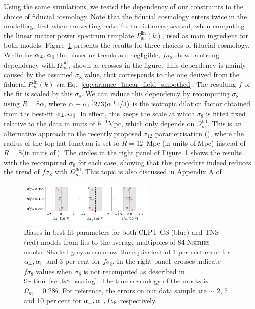 Using the same simulations, we tested the dependency of our constraints to the choice of 
fiducial cosmology. Note that the fiducial cosmology enters twice in the modelling, first
when converting redshifts to distances; second, when computing the linear matter power spectrum 
template $P_m^\text{lin}(k)$, used as main ingredient for both models. 
Figure~\ref{fig:rsd_fid_cosmo} presents the results for three choices of fiducial cosmology. 
While for ${\alpha_\perp}, {\alpha_\parallel}$ the biases or trends are negligible, $f\sigma_8$ shows 
a strong dependency with $\Omega_m^\text{fid}$, shown as crosses in the figure. 
This dependency is mainly caused by the assumed $\sigma_8$ value, that corresponds to the 
one derived from the fiducial $P_m^\text{lin}(k)$ via Eq.~\ref{eq:variance_linear_field_smoothed}.
The resulting $f$ of the fit is scaled by this $\sigma_8$. 
We can reduce this dependency by recomputing $\sigma_8$ using $R=8\alpha$\hmpc,
where $\alpha \equiv {\alpha_\perp}^(2/3){\alpha_\parallel}^(1/3)$ is the isotropic dilation factor obtained from the best-fit ${\alpha_\perp},{\alpha_\parallel}$.
In effect, this keeps the scale at which $\sigma_8$ is fitted fixed relative 
to the data in units of $h^{-1}$Mpc, which only depends on $\Omega_m^\text{fid}$. 
This is an alternative approach to the recently proposed $\sigma_{12}$ parametrisation 
(\cite{sanchezArgumentsUsingMpc2020}), where the radius of the top-hat function is set to 
$R=12$~Mpc (in units of Mpc) instead of $R=8$\hmpc (in units of \hmpc). 
The circles in the right panel of Figure~\ref{fig:rsd_fid_cosmo} shows the results with 
the recomputed $\sigma_8$ for each case, showing that this procedure indeed reduces the 
trend of $f\sigma_8$ with $\Omega_m^\text{fid}$. 
This topic is also discussed in Appendix A of \cite{alamCompletedSDSSIVExtended2021}. 

\begin{figure}
    \centering 
    \includegraphics[width=0.6\textwidth]{fig/galaxies/rsd_nseries_fidcosmo_updated.pdf}
    \caption{Biases in best-fit parameters for both CLPT-GS (blue) and TNS (red) 
    models from fits to the average multipoles of 84 \textsc{Nseries} mocks.
    Shaded grey areas show the equivalent of 1 per cent error for ${\alpha_\perp},{\alpha_\parallel}$
    and 3 per cent for $f\sigma_8$. In the right panel, crosses indicate $f\sigma_8$ values
    when $\sigma_8$ is not recomputed as described in Section~\ref{sec:fs8_scaling}. 
    The true cosmology of the mocks is $\Omega_m = 0.286$. 
    For reference, the errors on our data sample are $\sim$ 2, 3 and 10 per cent for 
    ${\alpha_\perp}, {\alpha_\parallel}, f\sigma_8$ respectively. }
    \label{fig:rsd_fid_cosmo}
\end{figure}

